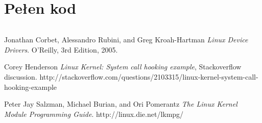 \documentclass[a4paper]{article}
\begin{document}
\section{Pełen kod}
\inputminted[linenos,fontsize=\footnotesize]{c}{../rt.c}

\begin{thebibliography}{9}
  Jonathan Corbet, Alessandro Rubini, and Greg Kroah-Hartman
  \emph{Linux Device Drivers}.
  O'Reilly,
  3rd Edition,
  2005.

  Corey Henderson
  \emph{Linux Kernel: System call hooking example}, Stackoverflow discussion.
  http://stackoverflow.com/questions/2103315/linux-kernel-system-call-hooking-example
  
  Peter Jay Salzman, Michael Burian, and Ori Pomerantz
  \emph{The Linux Kernel Module Programming Guide}.
  http://linux.die.net/lkmpg/
\end{thebibliography}
\end{document}
